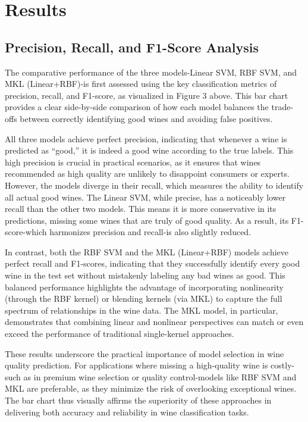 \documentclass[11pt]{article}
\begin{document}
\newpage  

\section{Results}

\subsection{Precision, Recall, and F1-Score Analysis}
The comparative performance of the three models-Linear SVM, RBF SVM, and MKL (Linear+RBF)-is first assessed using the key classification metrics of precision, recall, and F1-score, as visualized in Figure 3 above. This bar chart provides a clear side-by-side comparison of how each model balances the trade-offs between correctly identifying good wines and avoiding false positives.

All three models achieve perfect precision, indicating that whenever a wine is predicted as “good,” it is indeed a good wine according to the true labels. This high precision is crucial in practical scenarios, as it ensures that wines recommended as high quality are unlikely to disappoint consumers or experts. However, the models diverge in their recall, which measures the ability to identify all actual good wines. The Linear SVM, while precise, has a noticeably lower recall than the other two models. This means it is more conservative in its predictions, missing some wines that are truly of good quality. As a result, its F1-score-which harmonizes precision and recall-is also slightly reduced.

In contrast, both the RBF SVM and the MKL (Linear+RBF) models achieve perfect recall and F1-scores, indicating that they successfully identify every good wine in the test set without mistakenly labeling any bad wines as good. This balanced performance highlights the advantage of incorporating nonlinearity (through the RBF kernel) or blending kernels (via MKL) to capture the full spectrum of relationships in the wine data. The MKL model, in particular, demonstrates that combining linear and nonlinear perspectives can match or even exceed the performance of traditional single-kernel approaches.

These results underscore the practical importance of model selection in wine quality prediction. For applications where missing a high-quality wine is costly-such as in premium wine selection or quality control-models like RBF SVM and MKL are preferable, as they minimize the risk of overlooking exceptional wines. The bar chart thus visually affirms the superiority of these approaches in delivering both accuracy and reliability in wine classification tasks.
\end{document}
